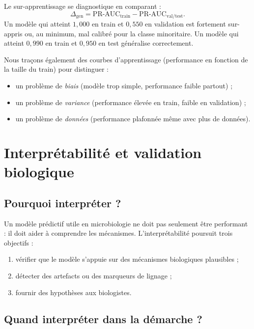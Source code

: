 \documentclass[11pt,a4paper]{article}
\begin{document}
Le sur-apprentissage se diagnostique en comparant :
\[
\Delta_{\text{gen}} = \text{PR-AUC}_{\text{train}} - \text{PR-AUC}_{\text{val/test}}.
\]
Un modèle qui atteint $1{,}000$ en train et $0{,}550$ en validation est fortement sur-appris ou, au minimum, mal calibré pour la classe minoritaire. Un modèle qui atteint $0{,}990$ en train et $0{,}950$ en test généralise correctement.

Nous traçons également des courbes d'apprentissage (performance en fonction de la taille du train) pour distinguer :
\begin{itemize}[leftmargin=1.2em]
    \item un problème de \emph{biais} (modèle trop simple, performance faible partout) ;
    \item un problème de \emph{variance} (performance élevée en train, faible en validation) ;
    \item un problème de \emph{données} (performance plafonnée même avec plus de données).
\end{itemize}

\section{Interprétabilité et validation biologique}

\subsection{Pourquoi interpréter ?}

Un modèle prédictif utile en microbiologie ne doit pas seulement être performant : il doit aider à comprendre les mécanismes. L'interprétabilité poursuit trois objectifs :
\begin{enumerate}[leftmargin=1.4em]
    \item vérifier que le modèle s'appuie sur des mécanismes biologiques plausibles ;
    \item détecter des artefacts ou des marqueurs de lignage ;
    \item fournir des hypothèses aux biologistes.
\end{enumerate}

\subsection{Quand interpréter dans la démarche ?}
\end{document}
